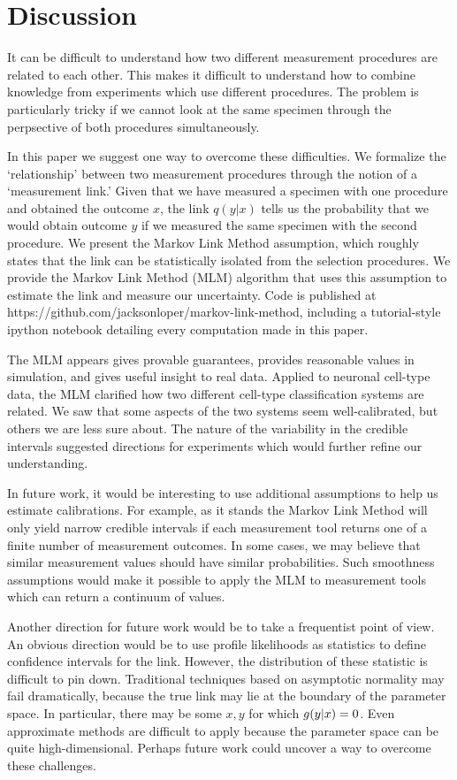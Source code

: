 \section{Discussion}

It can be difficult to understand how two different measurement procedures are related to each other.  This makes it difficult to understand how to combine knowledge from experiments which use different procedures.  The problem is particularly tricky if we cannot look at the same specimen through the perpsective of both procedures simultaneously.

In this paper we suggest one way to overcome these difficulties.  We formalize the `relationship' between two measurement procedures through the notion of a `measurement link.'  Given that we have measured a specimen with one procedure and obtained the outcome $x$, the link $q(y|x)$ tells us the probability that we would obtain outcome $y$ if we measured the same specimen with the second procedure.  We present the Markov Link Method assumption, which roughly states that the link can be statistically isolated from the selection procedures.  We provide the Markov Link Method (MLM) algorithm that uses this assumption to estimate the link and measure our uncertainty.  Code is published at https://github.com/jacksonloper/markov-link-method, including a tutorial-style ipython notebook detailing every computation made in this paper.

The MLM appears gives provable guarantees, provides reasonable values in simulation, and gives useful insight to real data.  Applied to neuronal cell-type data, the MLM clarified how two different cell-type classification systems are related.  We saw that some aspects of the two systems seem well-calibrated, but others we are less sure about.  The nature of the variability in the credible intervals suggested directions for experiments which would further refine our understanding.  

In future work, it would be interesting to use additional assumptions to help us estimate calibrations.  For example, as it stands the Markov Link Method will only yield narrow credible intervals if each measurement tool returns one of a finite number of measurement outcomes.  In some cases, we may believe that similar measurement values should have similar probabilities.  Such smoothness assumptions would make it possible to apply the MLM to measurement tools which can return a continuum of values.   

Another direction for future work would be to take a frequentist point of view.  An obvious direction would be to use profile likelihoods as statistics to define confidence intervals for the link.  However, the distribution of these statistic is difficult to pin down.  Traditional techniques based on asymptotic normality may fail dramatically, because the true link may lie at the boundary of the parameter space.  In particular, there may be some $x,y$ for which $g(y|x)=0$.  Even approximate methods are difficult to apply because the parameter space can be quite high-dimensional.  Perhaps future work could uncover a way to overcome these challenges.

